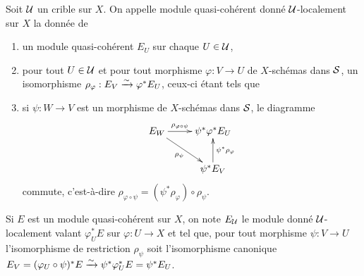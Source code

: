 \documentclass[oneside]{book}
\begin{document}
\subsubsection{}\label{I:1-4-4}

Soit $\mathcal{U}$ un crible sur $X$. On appelle module quasi-cohérent donné 
$\mathcal{U}$-localement sur $X$ la donnée de 
\begin{enumerate}[\indent a)]
  \item un module quasi-cohérent $E_U$ sur chaque $U\in\mathcal{U}$, 
  \item pour tout $U\in\mathcal{U}$ et pour tout morphisme $\varphi:V\to U$ de 
    $X$-schémas dans $\mathcal{S}$, un isomorphisme 
    $\rho_\varphi:E_V\xrightarrow\sim \varphi^* E_U$, ceux-ci étant tels que 
  \item si $\psi:W\to V$ est un morphisme de $X$-schémas dans $\mathcal{S}$, le 
    diagramme 
    \[\xymatrix{
      E_W \ar[r]^-{\rho_{\varphi\circ\psi}} \ar[dr]_-{\rho_\psi} 
        & \psi^*\varphi^* E_U \\
      & \psi^* E_V \ar[u]_-{\psi^*\rho_\varphi}
    }\]
    commute, c'est-à-dire 
    $\rho_{\varphi\circ\psi}=(\psi^*\rho_\varphi)\circ \rho_\psi$. 
\end{enumerate}

Si $E$ est un module quasi-cohérent sur $X$, on note $E_{\mathcal{U}}$ le module 
donné $\mathcal{U}$-localement valant $\varphi_U^* E$ sur $\varphi:U\to X$ et tel que, 
pour tout morphisme $\psi:V\to U$ l'isomorphisme de restriction $\rho_\psi$ 
soit l'isomorphisme canonique 
$E_V=(\varphi_U\circ \psi)^* E\xrightarrow\sim \psi^* \varphi_U^* E = \psi^* E_U$. 
\end{document}
